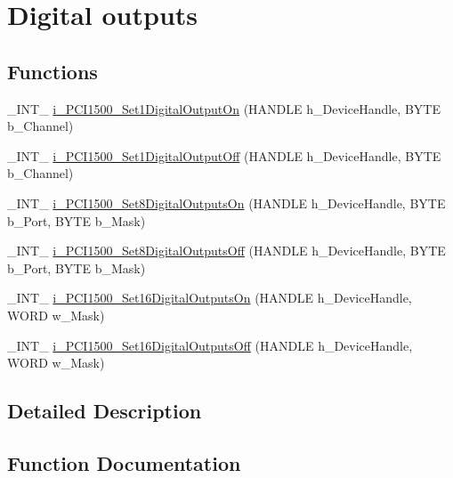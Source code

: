\hypertarget{group___dig_out}{}\section{Digital outputs}
\label{group___dig_out}
\subsection*{Functions}
\begin{DoxyCompactItemize}
\item 
\+\_\+\+I\+N\+T\+\_\+ \mbox{\hyperlink{group___dig_out_ga52b16658b547603cb615a5495aab2b55}{i\+\_\+\+P\+C\+I1500\+\_\+\+Set1\+Digital\+Output\+On}} (H\+A\+N\+D\+LE h\+\_\+\+Device\+Handle, B\+Y\+TE b\+\_\+\+Channel)
\item 
\+\_\+\+I\+N\+T\+\_\+ \mbox{\hyperlink{group___dig_out_ga4d0c85d3e0572549108d6510e7e7ddec}{i\+\_\+\+P\+C\+I1500\+\_\+\+Set1\+Digital\+Output\+Off}} (H\+A\+N\+D\+LE h\+\_\+\+Device\+Handle, B\+Y\+TE b\+\_\+\+Channel)
\item 
\+\_\+\+I\+N\+T\+\_\+ \mbox{\hyperlink{group___dig_out_ga67d3924f56604ce36526e94e1ae5f0bd}{i\+\_\+\+P\+C\+I1500\+\_\+\+Set8\+Digital\+Outputs\+On}} (H\+A\+N\+D\+LE h\+\_\+\+Device\+Handle, B\+Y\+TE b\+\_\+\+Port, B\+Y\+TE b\+\_\+\+Mask)
\item 
\+\_\+\+I\+N\+T\+\_\+ \mbox{\hyperlink{group___dig_out_gaa56bfb497b5c2e180bf3509fdd7a49b2}{i\+\_\+\+P\+C\+I1500\+\_\+\+Set8\+Digital\+Outputs\+Off}} (H\+A\+N\+D\+LE h\+\_\+\+Device\+Handle, B\+Y\+TE b\+\_\+\+Port, B\+Y\+TE b\+\_\+\+Mask)
\item 
\+\_\+\+I\+N\+T\+\_\+ \mbox{\hyperlink{group___dig_out_ga3c110d09da4a8660f691de1f4a55e009}{i\+\_\+\+P\+C\+I1500\+\_\+\+Set16\+Digital\+Outputs\+On}} (H\+A\+N\+D\+LE h\+\_\+\+Device\+Handle, W\+O\+RD w\+\_\+\+Mask)
\item 
\+\_\+\+I\+N\+T\+\_\+ \mbox{\hyperlink{group___dig_out_gad56d2e5a7cad23870dbe2ec25e9a7ac0}{i\+\_\+\+P\+C\+I1500\+\_\+\+Set16\+Digital\+Outputs\+Off}} (H\+A\+N\+D\+LE h\+\_\+\+Device\+Handle, W\+O\+RD w\+\_\+\+Mask)
\end{DoxyCompactItemize}


\subsection{Detailed Description}


\subsection{Function Documentation}
\mbox{\label{group___dig_out_ga52b16658b547603cb615a5495aab2b55}} 
